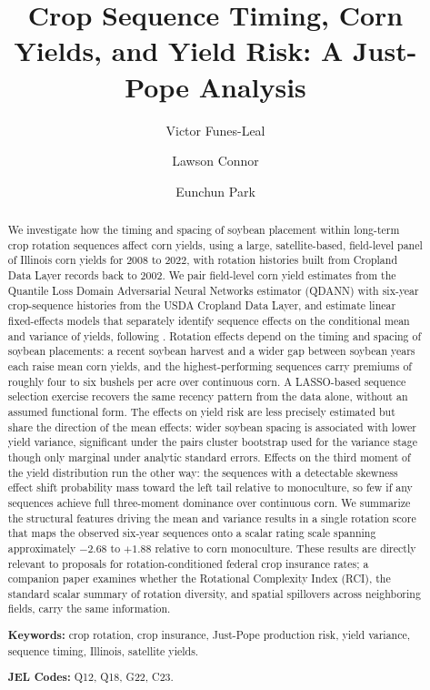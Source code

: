 \documentclass[12pt,letterpaper]{article}
\title{Crop Sequence Timing, Corn Yields, and Yield Risk: A Just-Pope Analysis}
\author[1]{Victor Funes-Leal}
\author[2]{Lawson Connor}
\author[3]{Eunchun Park}
\affil[1,2,3]{Department of Agricultural Economics and Agribusiness, University of Arkansas}
\date{}
\theoremstyle{remark}
\theoremstyle{remark}
\theoremstyle{plain}
\theoremstyle{definition}
\begin{document}
\maketitle
\begin{abstract}
\noindent
We investigate how the timing and spacing of soybean placement within long-term crop rotation sequences affect corn yields, using a large, satellite-based, field-level panel of Illinois corn yields for 2008 to 2022, with rotation histories built from Cropland Data Layer records back to 2002. We pair field-level corn yield estimates from the Quantile Loss Domain Adversarial Neural Networks estimator (QDANN) with six-year crop-sequence histories from the USDA Cropland Data Layer, and estimate linear fixed-effects models that separately identify sequence effects on the conditional mean and variance of yields, following \citet{Just1979}. Rotation effects depend on the timing and spacing of soybean placements: a recent soybean harvest and a wider gap between soybean years each raise mean corn yields, and the highest-performing sequences carry premiums of roughly four to six bushels per acre over continuous corn. A LASSO-based sequence selection exercise recovers the same recency pattern from the data alone, without an assumed functional form. The effects on yield risk are less precisely estimated but share the direction of the mean effects: wider soybean spacing is associated with lower yield variance, significant under the pairs cluster bootstrap used for the variance stage though only marginal under analytic standard errors. Effects on the third moment of the yield distribution run the other way: the sequences with a detectable skewness effect shift probability mass toward the left tail relative to monoculture, so few if any sequences achieve full three-moment dominance over continuous corn. We summarize the structural features driving the mean and variance results in a single rotation score that maps the observed six-year sequences onto a scalar rating scale spanning approximately $-2.68$ to $+1.88$ relative to corn monoculture. These results are directly relevant to proposals for rotation-conditioned federal crop insurance rates; a companion paper examines whether the Rotational Complexity Index (RCI), the standard scalar summary of rotation diversity, and spatial spillovers across neighboring fields, carry the same information.

\medskip\noindent
\textbf{Keywords:} crop rotation, crop insurance, Just-Pope production risk, yield variance, sequence timing, Illinois, satellite yields.

\medskip\noindent
\textbf{JEL Codes:} Q12, Q18, G22, C23.
\end{abstract}
\end{document}
